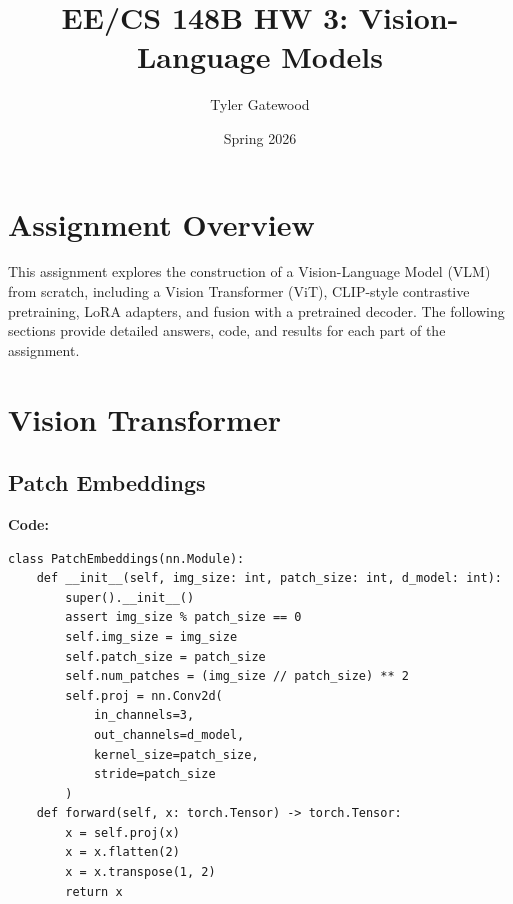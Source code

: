 \documentclass{article}
\title{EE/CS 148B HW 3: Vision-Language Models}
\author{Tyler Gatewood}
\date{Spring 2026}
\begin{document}
\maketitle

\section{Assignment Overview}
This assignment explores the construction of a Vision-Language Model (VLM) from scratch, including a Vision Transformer (ViT), CLIP-style contrastive pretraining, LoRA adapters, and fusion with a pretrained decoder. The following sections provide detailed answers, code, and results for each part of the assignment.

\section{Vision Transformer}
\subsection{Patch Embeddings}
\textbf{Code:}
\begin{verbatim}
class PatchEmbeddings(nn.Module):
    def __init__(self, img_size: int, patch_size: int, d_model: int):
        super().__init__()
        assert img_size % patch_size == 0
        self.img_size = img_size
        self.patch_size = patch_size
        self.num_patches = (img_size // patch_size) ** 2
        self.proj = nn.Conv2d(
            in_channels=3,
            out_channels=d_model,
            kernel_size=patch_size,
            stride=patch_size
        )
    def forward(self, x: torch.Tensor) -> torch.Tensor:
        x = self.proj(x)
        x = x.flatten(2)
        x = x.transpose(1, 2)
        return x
\end{verbatim}
\end{document}
